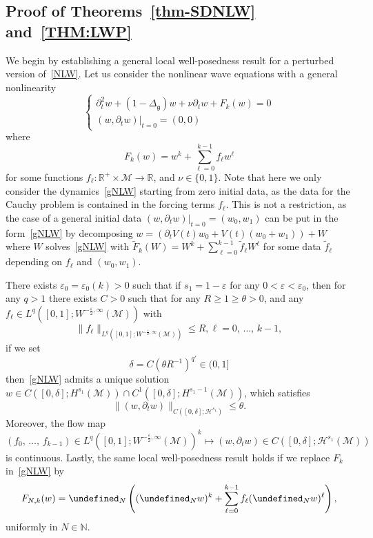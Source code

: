 \documentclass[AHL,Unicode,longabstracts,published]{cedram}
\newcommand{\R}{\mathbb{R}}
\newcommand{\N}{\mathbb{N}}
\let\P= \undefined
\newcommand{\P}{\mathbf{P}}
\newcommand{\M}{\mathcal{M}}
\renewcommand{\H}{\mathcal{H}}
\newcommand{\g}{\mathfrak{g}}
\newcommand{\dl}{\delta}
\newcommand{\Dlg}{\Delta_{\g}}
\newcommand{\eps}{\varepsilon}
\newcommand{\wt}{\widetilde}
\newcommand{\dt}{\partial_t}
\begin{document}
\subsection{Proof of Theorems~\ref{thm-SDNLW} and~\ref{THM:LWP}}\label{subsec-SDNLW+NLW}
We begin by establishing a general local well-posedness result for a perturbed version of~\eqref{NLW}. Let us consider the nonlinear wave equations with a general nonlinearity
\begin{equation}\label{gNLW}
\begin{cases}
\dt^2 w +(1 - \Dlg) w + \nu\dt w + F_k(w) = 0 \\
(w, \dt w) |_{t = 0} = (0,0)
\end{cases}
\end{equation}
where
\begin{equation*}
F_k(w)=w^k+\sum_{\ell=0}^{k-1} f_{\ell}w^{\ell}
\end{equation*}
for some functions $f_{\ell}: \R^+\times\M \rightarrow \R$, and $\nu\in \{0,1\}$. Note that here we only consider the dynamics~\eqref{gNLW} starting from zero initial data, as the data for the Cauchy problem is contained in the forcing terms $f_\ell$. This is not a restriction, as the case of a general initial data $(w,\dt w)|_{t=0}=(w_0,w_1)$ can be put in the form~\eqref{gNLW} by decomposing $w = (\dt V(t)w_0 + V(t)(w_0+w_1)) + W$ where $W$ solves~\eqref{gNLW} with $\wt F_k(W)=W^k+\sum_{\ell=0}^{k-1}\wt f_\ell W^\ell$ for some data $\wt f_\ell$ depending on $f_\ell$ and $(w_0,w_1)$.

\begin{prop}\label{prop-glocal}
There exists $\eps_0=\eps_0(k)>0$ such that if $s_1=1-\eps$ for any $0<\eps<\eps_0$, then for any $q> 1$ there exists $C>0$ such that for any $R\geq 1\geq \theta>0$, and any $f_{\ell}\in L^q([0,1];W^{-\frac\eps2,\infty}(\M))$ with 
\[
\|f_{\ell}\|_{L^q\left([0,1];W^{-\frac\eps2,\infty}(\M)\right)}\leq R, \ell=0,\,\dots,\,k-1,
\]
if we set
\begin{equation*}
\dl=C\left(\theta R^{-1}\right)^{q'}\in (0,1]
\end{equation*}
then~\eqref{gNLW} admits a unique solution $w\in C([0,\dl];H^{s_1}(\M))\cap C^1([0,\dl];H^{s_1-1}(\M))$, which satisfies
\begin{equation*}
\|(w,\dt w)\|_{C\left([0,\dl];\H^{s_1}\right)}\leq \theta.
\end{equation*}
Moreover, the flow map
\begin{equation*}
(f_0,\,\dots,\,f_{k-1})\in L^q\left([0,1];W^{-\frac{\eps}2,\infty}(\M)\right)^k \longmapsto (w,\dt w)\in C\left([0,\dl];\H^{s_1}(\M)\right)
\end{equation*}
is continuous. Lastly, the same local well-posedness result holds if we replace $F_k$ in~\eqref{gNLW} by
\begin{equation}\label{FNk}
F_{N,k}(w)= \P_N\left((\P_Nw)^k + \sum_{\ell=0}^{k-1}f_{\ell}(\P_N w)^{\ell}\right),
\end{equation}
uniformly in $N\in\N$.
\end{prop}
\end{document}

